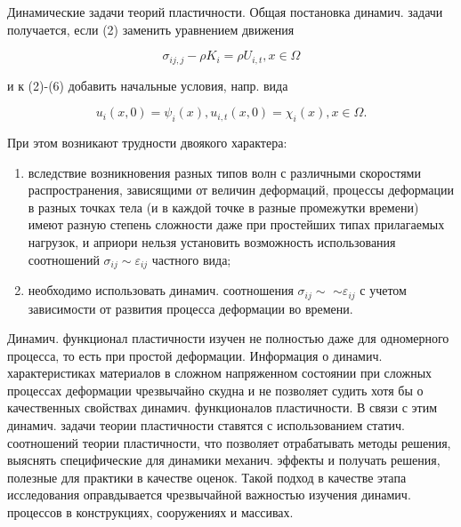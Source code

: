 \documentclass[10pt]{article}
\begin{document}
Динамические задачи теорий пластичности. Общая постановка динамич. задачи получается, если (2) заменить уравнением движения



\[

\sigma_{i j, j}-\rho K_{i}=\rho U_{i, t}, x \in \Omega

\]



и к (2)-(6) добавить начальные условия, напр. вида



\[

u_{i}(x, 0)=\psi_{i}(x), u_{i, t}(x, 0)=\chi_{i}(x), x \in \Omega .

\]



При этом возникают трудности двоякого характера:



\begin{enumerate}

  \item вследствие возникновения разных типов волн с различными скоростями распространения, зависящими от величин деформаций, процессы деформации в разных точках тела (и в каждой точке в разные промежутки времени) имеют разную степень сложности даже при простейших типах прилагаемых нагрузок, и априори нельзя установить возможность использования соотношений $\sigma_{i j} \sim \varepsilon_{i j}$ частного вида;



  \item необходимо использовать динамич. соотношения $\sigma_{i j} \sim$ $\sim \varepsilon_{i j}$ с учетом зависимости от развития процесса деформации во времени.



\end{enumerate}



Динамич. функционал пластичности изучен не полностью даже для одномерного процесса, то есть при простой деформации. Информация о динамич. характеристиках материалов в сложном напряженном состоянии при сложных процессах деформации чрезвычайно скудна и не позволяет судить хотя бы о качественных свойствах динамич. функционалов пластичности. В связи с этим динамич. задачи теории пластичности ставятся с использованием статич. соотношений теории пластичности, что позволяет отрабатывать методы решения, выяснять специфические для динамики механич. эффекты и получать решения, полезные для практики в качестве оценок. Такой подход в качестве этапа исследования оправдывается чрезвычайной важностью изучения динамич. процессов в конструкциях, сооружениях и массивах.
\end{document}
